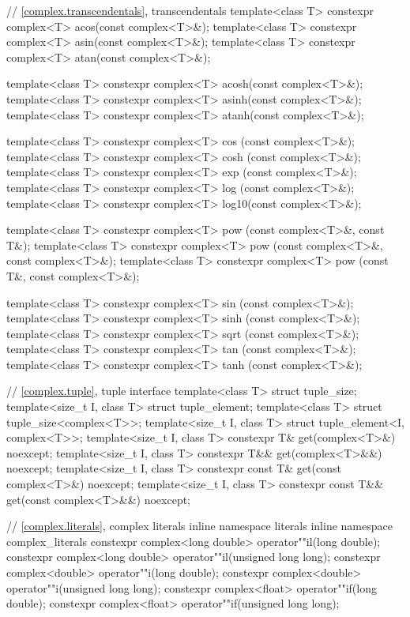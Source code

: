 \begin{codeblock}
{  // \ref{complex.transcendentals}, transcendentals
  template<class T> constexpr complex<T> acos(const complex<T>&);
  template<class T> constexpr complex<T> asin(const complex<T>&);
  template<class T> constexpr complex<T> atan(const complex<T>&);

  template<class T> constexpr complex<T> acosh(const complex<T>&);
  template<class T> constexpr complex<T> asinh(const complex<T>&);
  template<class T> constexpr complex<T> atanh(const complex<T>&);

  template<class T> constexpr complex<T> cos  (const complex<T>&);
  template<class T> constexpr complex<T> cosh (const complex<T>&);
  template<class T> constexpr complex<T> exp  (const complex<T>&);
  template<class T> constexpr complex<T> log  (const complex<T>&);
  template<class T> constexpr complex<T> log10(const complex<T>&);

  template<class T> constexpr complex<T> pow  (const complex<T>&, const T&);
  template<class T> constexpr complex<T> pow  (const complex<T>&, const complex<T>&);
  template<class T> constexpr complex<T> pow  (const T&, const complex<T>&);

  template<class T> constexpr complex<T> sin  (const complex<T>&);
  template<class T> constexpr complex<T> sinh (const complex<T>&);
  template<class T> constexpr complex<T> sqrt (const complex<T>&);
  template<class T> constexpr complex<T> tan  (const complex<T>&);
  template<class T> constexpr complex<T> tanh (const complex<T>&);

  // \ref{complex.tuple}, tuple interface
  template<class T> struct tuple_size;
  template<size_t I, class T> struct tuple_element;
  template<class T> struct tuple_size<complex<T>>;
  template<size_t I, class T> struct tuple_element<I, complex<T>>;
  template<size_t I, class T>
    constexpr T& get(complex<T>&) noexcept;
  template<size_t I, class T>
    constexpr T&& get(complex<T>&&) noexcept;
  template<size_t I, class T>
    constexpr const T& get(const complex<T>&) noexcept;
  template<size_t I, class T>
    constexpr const T&& get(const complex<T>&&) noexcept;

  // \ref{complex.literals}, complex literals
  inline namespace literals {
    inline namespace complex_literals {
      constexpr complex<long double> operator""il(long double);
      constexpr complex<long double> operator""il(unsigned long long);
      constexpr complex<double> operator""i(long double);
      constexpr complex<double> operator""i(unsigned long long);
      constexpr complex<float> operator""if(long double);
      constexpr complex<float> operator""if(unsigned long long);
    }
  }
}
\end{codeblock}

